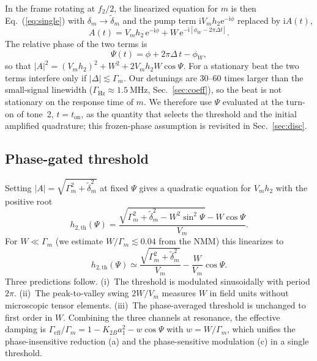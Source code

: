 \documentclass[aps,prb,reprint,superscriptaddress,floatfix]{revtex4-2}
\newcommand{\ii}{\mathrm{i}}
\newcommand{\ee}{\mathrm{e}}
\begin{document}
In the frame rotating at $f_2/2$, the linearized equation for $m$ is then Eq.~(\ref{eq:single}) with $\delta_m\to\tilde\delta_m$ and the pump term $\ii V_mh_2\ee^{-\ii\phi}$ replaced by $\ii A(t)$,
\begin{equation}
A(t)=V_mh_2\,\ee^{-\ii\phi}+W\,\ee^{-\ii[\phi_W-2\pi\Delta t]}.
\label{eq:A}
\end{equation}
The relative phase of the two terms is
\begin{equation}
\Psi(t)=\phi+2\pi\Delta\,t-\phi_W,
\label{eq:Psi}
\end{equation}
so that $|A|^2=(V_mh_2)^2+W^2+2V_mh_2W\cos\Psi$. For a stationary beat the two terms interfere only if $|\Delta|\lesssim\Gamma_m$. Our detunings are 30--60 times larger than the small-signal linewidth ($\Gamma_{\mathrm{Hz}}\approx\SI{1.5}{\mega\hertz}$, Sec.~\ref{sec:coeff}), so the beat is not stationary on the response time of $m$. We therefore use $\Psi$ evaluated at the turn-on of tone~2, $t=t_{\mathrm{on}}$, as the quantity that selects the threshold and the initial amplified quadrature; this frozen-phase assumption is revisited in Sec.~\ref{sec:disc}.

\subsection{Phase-gated threshold}\label{sec:gatedthr}

Setting $|A|=\sqrt{\Gamma_m^2+\tilde\delta_m^2}$ at fixed $\Psi$ gives a quadratic equation for $V_mh_2$ with the positive root
\begin{equation}
h_{2,\mathrm{th}}(\Psi)=\frac{\sqrt{\Gamma_m^2+\tilde\delta_m^2-W^2\sin^2\Psi}-W\cos\Psi}{V_m}.
\label{eq:hth}
\end{equation}
For $W\ll\Gamma_m$ (we estimate $W/\Gamma_m\lesssim 0.04$ from the NMM) this linearizes to
\begin{equation}
h_{2,\mathrm{th}}(\Psi)\simeq\frac{\sqrt{\Gamma_m^2+\tilde\delta_m^2}}{V_m}-\frac{W}{V_m}\cos\Psi .
\label{eq:hthlin}
\end{equation}
Three predictions follow. (i)~The threshold is modulated sinusoidally with period $2\pi$. (ii)~The peak-to-valley swing $2W/V_m$ measures $W$ in field units without microscopic tensor elements. (iii)~The phase-averaged threshold is unchanged to first order in $W$. Combining the three channels at resonance, the effective damping is $\Gamma_{\mathrm{eff}}/\Gamma_m=1-K_{2B}a_1^2-w\cos\Psi$ with $w=W/\Gamma_m$, which unifies the phase-insensitive reduction (a) and the phase-sensitive modulation (c) in a single threshold.
\end{document}
